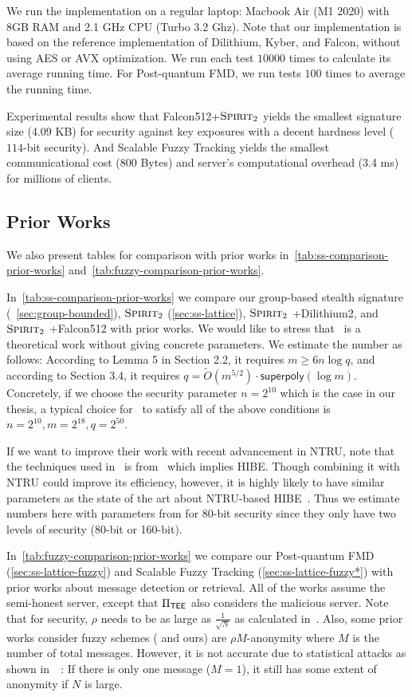 We run the implementation on a regular laptop: Macbook Air (M1 2020) with 8GB RAM and 2.1 GHz CPU (Turbo 3.2 Ghz). Note that our implementation is based on the reference implementation of Dilithium, Kyber, and Falcon, without using AES or AVX optimization. We run each test $10000$ times to calculate its average running time. For Post-quantum FMD, we run tests $100$ times to average the running time.

Experimental results show that Falcon512+$\textsc{Spirit}_2$ yields the smallest signature size (4.09 KB) for security against key exposures with a decent hardness level ($114$-bit security). And Scalable Fuzzy Tracking yields the smallest communicational cost (800 Bytes) and server's computational overhead (3.4 ms) for millions of clients.

\subsection{Prior Works}
We also present tables for comparison with prior works in~\cref{tab:ss-comparison-prior-works} and~\cref{tab:fuzzy-comparison-prior-works}.

In~\cref{tab:ss-comparison-prior-works} we compare our group-based stealth signature (~\cref{sec:group-bounded}), $\textsc{Spirit}_2$ (\cref{sec:ss-lattice}), $\textsc{Spirit}_2$ +Dilithium2, and $\textsc{Spirit}_2$ +Falcon512 with prior works.
We would like to stress that~\cite{ESORICS:LLNYY20} is a theoretical work without giving concrete parameters. We estimate the number as follows: According to Lemma 5 in Section 2.2, it requires $m \ge 6n\log q$, and according to Section 3.4, it requires $q=\tilde{O}(m^{5/2})\cdot\mathsf{superpoly}(\log m)$. Concretely, if we choose the security parameter $n=2^{10}$ which is the case in our thesis, a typical choice for~\cite{ESORICS:LLNYY20} to satisfy all of the above conditions is $n=2^{10}, m=2^{18}, q=2^{50}$.

If we want to improve their work with recent advancement in NTRU, note that the techniques used in~\cite{ESORICS:LLNYY20} is from~\cite{EC:AgrBonBoy10} which implies HIBE. Though combining it with NTRU could improve its efficiency, however, it is highly likely to have similar parameters as the state of the art about NTRU-based HIBE~\cite{EPRINT:ZMSSO21}. Thus we estimate numbers here with parameters from \cite{EPRINT:ZMSSO21} for 80-bit security since they only have two levels of security (80-bit or 160-bit). 

In~\cref{tab:fuzzy-comparison-prior-works} we compare our Post-quantum FMD (\cref{sec:ss-lattice-fuzzy}) and Scalable Fuzzy Tracking (\cref{sec:ss-lattice-fuzzy*}) with prior works about message detection or retrieval. All of the works assume the semi-honest server, except that $\Pi_{\mathsf{TEE}}$ also considers the malicious server.
Note that for security, $\rho$ needs to be as large as $\frac{1}{\sqrt{N}}$ as calculated in~\cite{EPRINT:SerPejBur21}. Also, some prior works consider fuzzy schemes (\cite{CCS:BLMG21} and ours) are $\rho M$-anonymity where $M$ is the number of total messages. However, it is not accurate due to statistical attacks as shown in~~\cite{EPRINT:SerPejBur21}: If there is only one message ($M=1$), it still has some extent of anonymity if $N$ is large.

